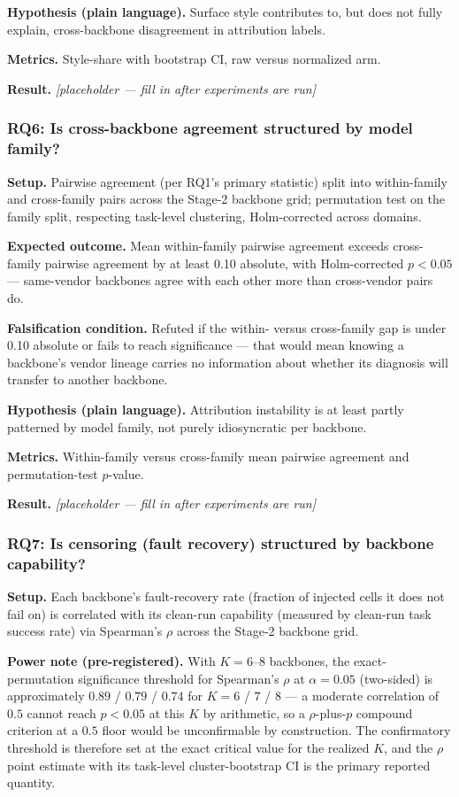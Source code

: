 \documentclass[11pt]{article}
\newcommand{\ph}{\textit{[placeholder --- fill in after experiments are run]}}
\begin{document}
\textbf{Hypothesis (plain language).} Surface style contributes to, but does not fully explain, cross-backbone disagreement in attribution labels.

\textbf{Metrics.} Style-share with bootstrap CI, raw versus normalized arm.

\textbf{Result.} \ph

\subsubsection{RQ6: Is cross-backbone agreement structured by model family?}
\textbf{Setup.} Pairwise agreement (per RQ1's primary statistic) split into within-family and cross-family pairs across the Stage-2 backbone grid; permutation test on the family split, respecting task-level clustering, Holm-corrected across domains.

\textbf{Expected outcome.} Mean within-family pairwise agreement exceeds cross-family pairwise agreement by at least 0.10 absolute, with Holm-corrected $p < 0.05$ --- same-vendor backbones agree with each other more than cross-vendor pairs do.

\textbf{Falsification condition.} Refuted if the within- versus cross-family gap is under 0.10 absolute or fails to reach significance --- that would mean knowing a backbone's vendor lineage carries no information about whether its diagnosis will transfer to another backbone.

\textbf{Hypothesis (plain language).} Attribution instability is at least partly patterned by model family, not purely idiosyncratic per backbone.

\textbf{Metrics.} Within-family versus cross-family mean pairwise agreement and permutation-test $p$-value.

\textbf{Result.} \ph

\subsubsection{RQ7: Is censoring (fault recovery) structured by backbone capability?}
\textbf{Setup.} Each backbone's fault-recovery rate (fraction of injected cells it does not fail on) is correlated with its clean-run capability (measured by clean-run task success rate) via Spearman's $\rho$ across the Stage-2 backbone grid.

\textbf{Power note (pre-registered).} With $K = 6$--$8$ backbones, the exact-permutation significance threshold for Spearman's $\rho$ at $\alpha = 0.05$ (two-sided) is approximately $0.89$ / $0.79$ / $0.74$ for $K = 6$ / $7$ / $8$ --- a moderate correlation of $0.5$ cannot reach $p < 0.05$ at this $K$ by arithmetic, so a $\rho$-plus-$p$ compound criterion at a $0.5$ floor would be unconfirmable by construction. The confirmatory threshold is therefore set at the exact critical value for the realized $K$, and the $\rho$ point estimate with its task-level cluster-bootstrap CI is the primary reported quantity.
\end{document}
